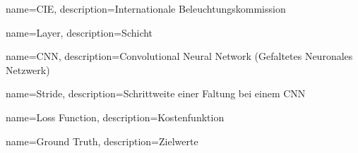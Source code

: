 {
	name=CIE,
	description={Internationale Beleuchtungskommission}
}

{
	name=Layer,
	description={Schicht}
}

{
	name=CNN,
	description={Convolutional Neural Network (Gefaltetes Neuronales Netzwerk)}
}

{
	name=Stride,
	description={Schrittweite einer Faltung bei einem \gls{CNN}}
}

{
	name=Loss Function,
	description={Kostenfunktion}
}

{
	name=Ground Truth,
	description={Zielwerte}
}
